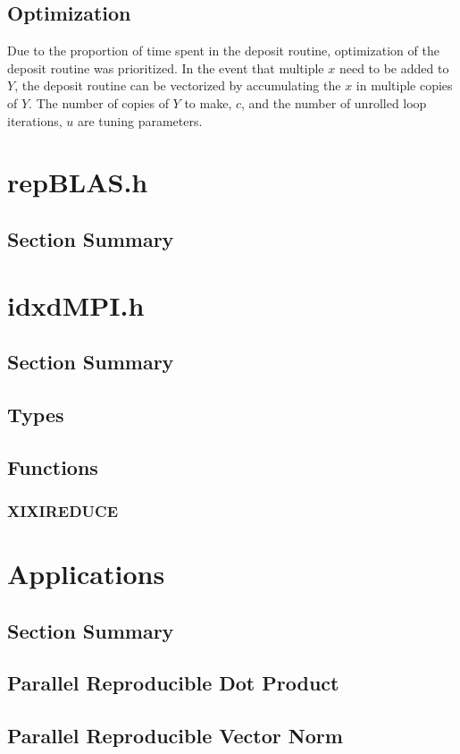 \documentclass[12pt]{article}
\theoremstyle{plain}
\numberwithin{equation}{section}
\begin{document}
  \subsection{Optimization}
    Due to the proportion of time spent in the deposit routine, optimization of the deposit routine was prioritized. In the event that multiple $x$ need to be added to $Y$, the deposit routine can be vectorized by accumulating the $x$ in multiple copies of $Y$. The number of copies of $Y$ to make, $c$, and the number of unrolled loop iterations, $u$ are tuning parameters.
\section{repBLAS.h}
  \subsection{Section Summary}
\section{idxdMPI.h}
  \subsection{Section Summary}
  \subsection{Types}
  \subsection{Functions}
    \subsubsection{XIXIREDUCE}
\section{Applications}
  \subsection{Section Summary}
  \subsection{Parallel Reproducible Dot Product}
  \subsection{Parallel Reproducible Vector Norm}
\end{document}
